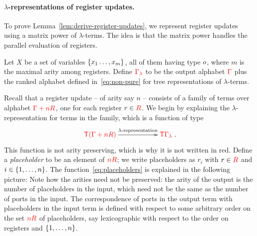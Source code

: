 \paragraph*{$\lambda$-representations of register updates.}
To prove Lemma~\ref{lem:derive-register-updates}, we represent  register updates using a matrix power of $\lambda$-terms. The idea is that the matrix power handles the parallel evaluation of registers.

Let $X$ be a set of variables $\{x_1\dots,x_m\}$, all of them having type $o$,  where $m$ is the maximal arity among registers. Define  ${\color{red}{\Gamma_\lambda}}$ to be the output alphabet ${\color{red}{\Gamma}}$ plus the ranked alphabet defined in~\eqref{eq:non-pure} for tree representations of  $\lambda$-terms. 

Recall that a register update -- of arity say $n$ -- consists of a family of terms  over alphabet ${\color{red}{\Gamma + n{{\color{red}{R}}}}}$, one for each register $r \in {{\color{red}{R}}}$. We begin by explaining the $\lambda$-representation for terms in the family, which is a function 
 of type
\begin{align}\label{eq:placeholders}
\xymatrix@C=2cm{
    \ranked{\tmonad(\rGamma+n R)} \ar[r]^-{\text{$\lambda$-representation}} &
    \ranked{\tmonad {\Gamma_\lambda}}
}.
\end{align}
This function  is not arity preserving, which is why it is not written in red. Define a  \emph{placeholder} to be an element of ${\color{red}{n {{\color{red}{R}}}}}$; we write placeholders as $r_i$ with $r \in {{\color{red}{R}}}$ and  $i \in \{1,\ldots,n\}$.
The function~\eqref{eq:placeholders}  is  explained in the following picture:
Note how the  
 arities need not be preserved: the arity of the output is the number of placeholders in the input, which need not be the same as the number of ports in the input. The correspondence of ports in the output term with placeholders in the input term is defined with respect to some arbitrary order on the set ${\color{red}{n {{\color{red}{R}}}}}$ of placeholders, say lexicographic with respect to the order on registers and  $\{1,\ldots,n\}$.

